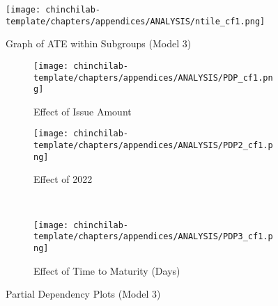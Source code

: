 \begin{figure}[h!]
    \centering
    \texttt{[image: chinchilab-template/chapters/appendices/ANALYSIS/ntile\_cf1.png]}
    \caption{Graph of ATE within Subgroups (Model 3)}
    \label{fig:my_label}
\end{figure}

\begin{figure}[H]
\centering
   \begin{subfigure}[b]{0.45\textwidth}
    \texttt{[image: chinchilab-template/chapters/appendices/ANALYSIS/PDP\_cf1.png]}
    \caption{Effect of Issue Amount}
   \label{fig:Ng1} 
\end{subfigure}
\begin{subfigure}[b]{0.4\textwidth}
    \texttt{[image: chinchilab-template/chapters/appendices/ANALYSIS/PDP2\_cf1.png]}
    \caption{Effect of 2022}
   \label{fig:Ng2}
\end{subfigure}
\\
\begin{subfigure}[b]{0.45\textwidth}
    \texttt{[image: chinchilab-template/chapters/appendices/ANALYSIS/PDP3\_cf1.png]}
    \caption{Effect of Time to Maturity (Days)}
   \label{fig:Ng2}
\end{subfigure}
\caption{Partial Dependency Plots (Model 3)}
\end{figure}

\newpage
